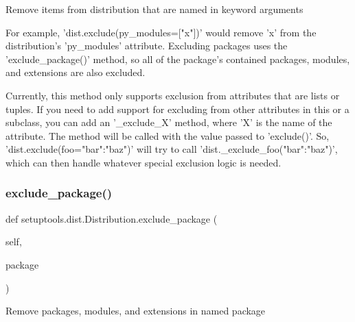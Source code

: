 \begin{DoxyVerb}Remove items from distribution that are named in keyword arguments

For example, 'dist.exclude(py_modules=["x"])' would remove 'x' from
the distribution's 'py_modules' attribute.  Excluding packages uses
the 'exclude_package()' method, so all of the package's contained
packages, modules, and extensions are also excluded.

Currently, this method only supports exclusion from attributes that are
lists or tuples.  If you need to add support for excluding from other
attributes in this or a subclass, you can add an '_exclude_X' method,
where 'X' is the name of the attribute.  The method will be called with
the value passed to 'exclude()'.  So, 'dist.exclude(foo={"bar":"baz"})'
will try to call 'dist._exclude_foo({"bar":"baz"})', which can then
handle whatever special exclusion logic is needed.
\end{DoxyVerb}
 \mbox{\label{classsetuptools_1_1dist_1_1_distribution_afc5f2e32b85d40dbd223aa3e1bd33cf9}} 
\subsubsection{\texorpdfstring{exclude\+\_\+package()}{exclude\_package()}}
{\footnotesize\ttfamily def setuptools.\+dist.\+Distribution.\+exclude\+\_\+package (\begin{DoxyParamCaption}\item[{}]{self,  }\item[{}]{package }\end{DoxyParamCaption})}

\begin{DoxyVerb}Remove packages, modules, and extensions in named package\end{DoxyVerb}
 \mbox{\label{classsetuptools_1_1dist_1_1_distribution_a8de1a9e80efdb1b08e3c12e4456797a2}} 
